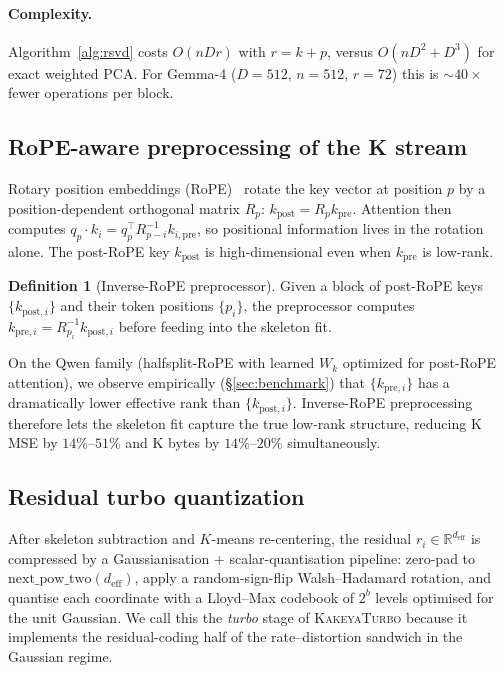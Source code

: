 \documentclass[11pt,a4paper]{article}
\theoremstyle{definition}
\newtheorem{definition}{Definition}[section]
\theoremstyle{plain}
\newcommand{\R}{\mathbb{R}}
\begin{document}
\paragraph{Complexity.}
Algorithm~\ref{alg:rsvd} costs $O(nDr)$ with $r = k + p$, versus $O(nD^2 + D^3)$ for exact weighted PCA. For Gemma-4 ($D=512$, $n=512$, $r=72$) this is $\sim 40\times$ fewer operations per block.

\subsection{RoPE-aware preprocessing of the K stream}
\label{sec:rope}

Rotary position embeddings (RoPE)~\cite{rope} rotate the key vector at position $p$ by a position-dependent orthogonal matrix $R_p$: $k_{\text{post}} = R_p k_{\text{pre}}$. Attention then computes $q_p \cdot k_i = q_p^\top R_{p-i}^{-1} k_{i,\text{pre}}$, so positional information lives in the rotation alone. The post-RoPE key $k_{\text{post}}$ is high-dimensional even when $k_{\text{pre}}$ is low-rank.

\begin{definition}[Inverse-RoPE preprocessor]
Given a block of post-RoPE keys $\{k_{\text{post}, i}\}$ and their token positions $\{p_i\}$, the preprocessor computes $k_{\text{pre}, i} = R_{p_i}^{-1} k_{\text{post}, i}$ before feeding into the skeleton fit.
\end{definition}

On the Qwen family (halfsplit-RoPE with learned $W_k$ optimized for post-RoPE attention), we observe empirically (\S\ref{sec:benchmark}) that $\{k_{\text{pre}, i}\}$ has a dramatically lower effective rank than $\{k_{\text{post}, i}\}$. Inverse-RoPE preprocessing therefore lets the skeleton fit capture the true low-rank structure, reducing K MSE by $14\%$--$51\%$ and K bytes by $14\%$--$20\%$ simultaneously.

\subsection{Residual turbo quantization}

After skeleton subtraction and $K$-means re-centering, the residual $r_i \in \R^{d_{\text{eff}}}$ is compressed by a Gaussianisation + scalar-quantisation pipeline: zero-pad to $\text{next\_pow\_two}(d_{\text{eff}})$, apply a random-sign-flip Walsh--Hadamard rotation, and quantise each coordinate with a Lloyd--Max codebook of $2^b$ levels optimised for the unit Gaussian. We call this the \emph{turbo} stage of \textsc{KakeyaTurbo} because it implements the residual-coding half of the rate--distortion sandwich in the Gaussian regime.
\end{document}
